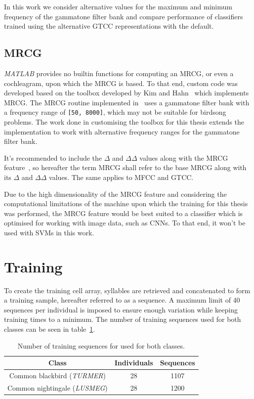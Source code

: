 In this work we consider alternative values for the maximum and minimum
frequency of the gammatone filter bank and compare performance of classifiers
trained using the alternative GTCC representations with the default.

\subsection{MRCG}

\textit{MATLAB} provides no builtin functions for computing an MRCG, or even a
cochleagram, upon which the MRCG is based. To that end, custom code was
developed based on the toolbox developed by Kim and Hahn~\cite{kim2018voice}
which implements MRCG\@. The MRCG routine implemented in~\cite{kim2018voice}
uses a gammatone filter bank with a frequency range of \texttt{[50, 8000]},
which may not be suitable for birdsong problems. The work done in customising
the toolbox for this thesis extends the implementation to work with alternative
frequency ranges for the gammatone filter bank.

It's recommended to include the $\Delta$ and $\Delta\Delta$ values along with
the MRCG feature~\cite{chen2014feature}, so hereafter the term MRCG shall refer to
the base MRCG along with its $\Delta$ and $\Delta\Delta$ values. The same
applies to MFCC and GTCC\@.

Due to the high dimensionality of the MRCG feature and considering the
computational limitations of the machine upon which the training for this thesis
was performed, the MRCG feature would be best suited to a classifier which is
optimised for working with image data, such as CNNs\@. To that end, it won't
be used with SVMs in this work.

\section{Training}\label{sec:training}

To create the training cell array, syllables are retrieved and concatenated to form
a training sample, hereafter referred to as a sequence. A maximum limit of 40
sequences per individual is imposed to ensure enough variation while keeping
training times to a minimum. The number of training sequences used for both
classes can be seen in table~\ref{table:training_samples}.

\begin{table}[h!t]
\begin{center}
\begin{tabular}{c c c}
\toprule
Class & Individuals & Sequences \\ [0.5ex]
\midrule
Common blackbird (\textit{TURMER}) & 28 & 1107 \\
Common nightingale (\textit{LUSMEG}) & 28 & 1200 \\
\bottomrule
\end{tabular}
\caption{Number of training sequences for used for both
classes.}\label{table:training_samples}
\end{center}
\end{table}

